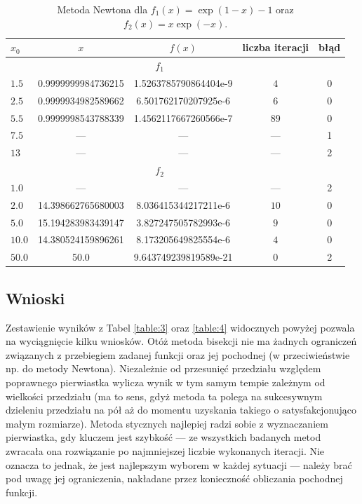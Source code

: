 \documentclass{classrep}
\begin{document}
		\begin{table}[!hpbt]
        		\centering
        		\footnotesize
			\begin{tabular}{lSScc} \toprule
				{$x_0$} & {$x$} & {$f(x)$} & {liczba iteracji} & {błąd} \\ \midrule
				 \\ \hline
				$1.5$ & 0.9999999984736215 & 1.5263785790864404e-9 & $4$ & 0\\ 
				$2.5$ & 0.9999934982589662 & 6.501762170207925e-6 & $6$ & 0\\
	 			$5.5$ & 0.9999998543788339 & 1.4562117667260566e-7 & $89$ & 0\\
	 			$7.5$ & {---} & {---} & {---} & 1\\
	 			$13$ & {---} & {---} & {---} & 2\\ \hline
	 			 \\ \hline
	 			$1.0$ & {---} & {---} & {---} & 2 \\ 
	 			$2.0$ & 14.398662765680003 & 8.036415344217211e-6 & $10$ & 0\\ 
	 			$5.0$ & 15.194283983439147 & 3.827247505782993e-6 & $9$ & 0\\
	 			$10.0$ & 14.380524159896261 & 8.173205649825554e-6 & $4$ & 0\\ 
	 			$50.0$ & 50.0 & 9.643749239819589e-21 & $0$ & 2\\ \bottomrule
	 		\end{tabular}
	 		\caption{Metoda Newtona dla $f_1(x)=\exp(1-x)-1$ oraz $f_2(x)=x\exp(-x)$.}
			\label{table:5}			
		\end{table}	

	\subsection{Wnioski}
		Zestawienie wyników z Tabel \ref{table:3} oraz \ref{table:4} widocznych powyżej pozwala na wyciągnięcie kilku wniosków. Otóż metoda bisekcji nie ma żadnych ograniczeń związanych z przebiegiem zadanej funkcji oraz jej pochodnej (w przeciwieństwie np. do metody Newtona). Niezależnie od przesunięć przedziału względem poprawnego pierwiastka wylicza wynik w tym samym tempie zależnym od wielkości przedziału (ma to sens, gdyż metoda ta polega na sukcesywnym dzieleniu przedziału na pół aż do momentu uzyskania takiego o satysfakcjonująco małym rozmiarze). Metoda stycznych najlepiej radzi sobie z wyznaczaniem pierwiastka, gdy kluczem jest szybkość --- ze wszystkich badanych metod zwracała ona rozwiązanie po najmniejszej liczbie wykonanych iteracji. Nie oznacza to jednak, że jest najlepszym wyborem w każdej sytuacji --- należy brać pod uwagę jej ograniczenia, nakładane przez konieczność obliczania pochodnej funkcji.  \\
	
\end{document}
